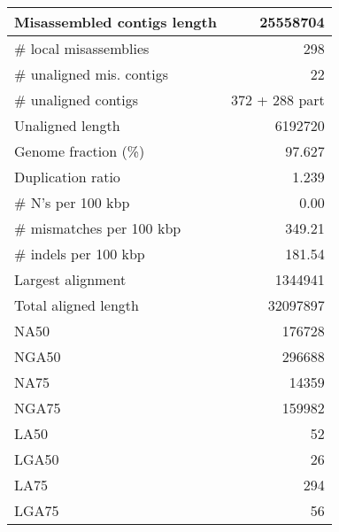 \documentclass[12pt,a4paper]{article}
\begin{document}
\begin{table}[ht]
\begin{center}
\begin{tabular}{|l*{1}{|r}|}
Misassembled contigs length & 25558704 \\ \hline
\# local misassemblies & 298 \\ \hline
\# unaligned mis. contigs & 22 \\ \hline
\# unaligned contigs & 372 + 288 part \\ \hline
Unaligned length & 6192720 \\ \hline
Genome fraction (\%) & 97.627 \\ \hline
Duplication ratio & 1.239 \\ \hline
\# N's per 100 kbp & 0.00 \\ \hline
\# mismatches per 100 kbp & 349.21 \\ \hline
\# indels per 100 kbp & 181.54 \\ \hline
Largest alignment & 1344941 \\ \hline
Total aligned length & 32097897 \\ \hline
NA50 & 176728 \\ \hline
NGA50 & 296688 \\ \hline
NA75 & 14359 \\ \hline
NGA75 & 159982 \\ \hline
LA50 & 52 \\ \hline
LGA50 & 26 \\ \hline
LA75 & 294 \\ \hline
LGA75 & 56 \\ \hline
\end{tabular}
\end{center}
\end{table}
\end{document}
